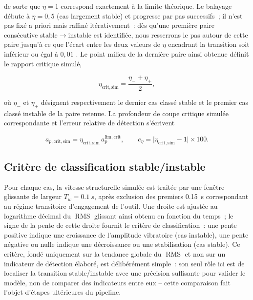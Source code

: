 \documentclass[
    11pt,
    a4paper
]{article}
\newcommand{\apcrit}{a_p^{\mathrm{lim,crit}}}
\newcommand{\RMS}{\operatorname{RMS}}
\newcommand{\etasim}{\eta_{\mathrm{crit,sim}}}
\begin{document}
de sorte que \(\eta = 1\) correspond exactement à la limite théorique. Le
balayage débute à \(\eta = 0,5\) (cas largement stable) et progresse par pas
successifs~; il n'est pas fixé a priori mais raffiné itérativement~: dès
qu'une première paire consécutive stable\(\to\)instable est identifiée, nous
resserrons le pas autour de cette paire jusqu'à ce que l'écart entre les deux
valeurs de \(\eta\) encadrant la transition soit inférieur ou égal à
\(0,01\)
. Le point milieu de la dernière paire ainsi obtenue définit le rapport
critique simulé,

\begin{equation}
    \etasim = \frac{\eta_{-} + \eta_{+}}{2},
    \label{eq-eta_crit_sim}
\end{equation}

où \(\eta_{-}\) et \(\eta_{+}\) désignent respectivement le dernier cas
classé stable et le premier cas classé instable de la paire retenue. La
profondeur de coupe critique simulée correspondante et l'erreur relative de
détection s'écrivent

\begin{equation}
    a_{p,\mathrm{crit,sim}} = \etasim \, \apcrit,
    \qquad
    e_{\eta} = \bigl|\etasim - 1\bigr| \times 100.
    \label{eq-erreur_eta}
\end{equation}

\subsection{Critère de classification stable/instable}
\label{sec-classification}

Pour chaque cas, la vitesse structurelle simulée est traitée par une fenêtre
glissante de largeur \(T_w = \SI{0.1}{s}\), après exclusion des premiers
\SI{0.15}{s} correspondant au régime transitoire d'engagement de l'outil. Une
droite est ajustée au logarithme décimal du \(\RMS\) glissant ainsi obtenu en
fonction du temps~; le signe de la pente de cette droite fournit le critère
de classification~: une pente positive indique une croissance de
l'amplitude vibratoire (cas instable), une pente négative ou nulle indique
une décroissance ou une stabilisation (cas stable). Ce critère, fondé
uniquement sur la tendance globale du \(\RMS\) et non sur un indicateur de
détection élaboré, est délibérément simple~: son seul rôle ici est de
localiser la transition stable/instable avec une précision suffisante pour
valider le modèle, non de comparer des indicateurs entre eux -- cette
comparaison fait l'objet d'étapes ultérieures du pipeline.
\end{document}

